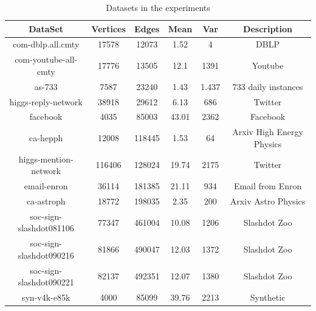 \documentclass{sig-alternate-2013}
\begin{document}
\begin{table}[!hpp]
\centering
\caption{Datasets in the experiments}
\begin{tabular}{cccccc}
\hline
DataSet                 & Vertices  & Edges   &Mean    &Var     & Description\\
\hline
com-dblp.all.cmty       & 17578     & 12073   &1.52     &4      & DBLP\\
com-youtube-all-cmty    & 17776     & 13505   &12.1     &1391   & Youtube\\
as-733                  & 7587      & 23240   &1.43     &1.437  & 733 daily instances\\
higgs-reply-network     & 38918     & 29612   &6.13     &686    & Twitter\\
facebook                & 4035      & 85003   &43.01    &2362   & Facebook \\
ca-hepph                & 12008     & 118445  &1.53     &64     & Arxiv High Energy Physics\\
higgs-mention-network   & 116406    & 128024  &19.74    &2175   & Twitter\\
email-enron             & 36114     & 181385  &21.11    &934    & Email from Enron\\
ca-astroph              & 18772     & 198035  &2.35     &200    & Arxiv Astro Physics\\
soc-sign-slashdot081106 & 77347     & 461004  &10.08    &1206   & Slashdot Zoo \\
soc-sign-slashdot090216 & 81866     & 490047  &12.03    &1372   & Slashdot Zoo\\
soc-sign-slashdot090221 & 82137     & 492351  &12.07    &1380   & Slashdot Zoo\\
syn-v4k-e85k            & 4000      & 85099   &39.76 &2213   & Synthetic\\
\hline
\end{tabular}
\end{table}
\end{document}
